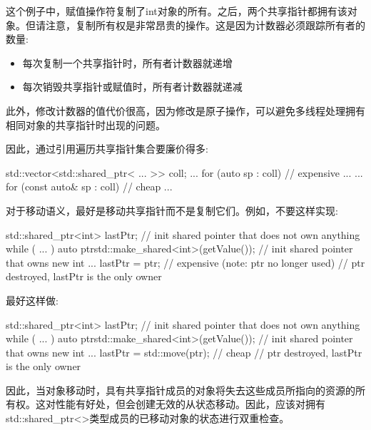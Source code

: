 这个例子中，赋值操作符复制了int对象的所有。之后，两个共享指针都拥有该对象。但请注意，复制所有权是非常昂贵的操作。这是因为计数器必须跟踪所有者的数量:\par

\begin{itemize}
  \item 每次复制一个共享指针时，所有者计数器就递增
  \item 每次销毁共享指针或赋值时，所有者计数器就递减
\end{itemize}

此外，修改计数器的值代价很高，因为修改是原子操作，可以避免多线程处理拥有相同对象的共享指针时出现的问题。\par

因此，通过引用遍历共享指针集合要廉价得多:\par

\begin{codebox}[cpp]
std::vector<std::shared_ptr< ... >> coll;
...
for (auto sp : coll) { // expensive
  ...
}
...
for (const auto& sp : coll) { // cheap
  ...
}
\end{codebox}

对于移动语义，最好是移动共享指针而不是复制它们。例如，不要这样实现:\par

\begin{codebox}[cpp]
std::shared_ptr<int> lastPtr; // init shared pointer that does not own anything
while ( ... ) {
  auto ptr{std::make_shared<int>(getValue())}; // init shared pointer that owns new int
  ...
  lastPtr = ptr; // expensive (note: ptr no longer used)
} // ptr destroyed, lastPtr is the only owner
\end{codebox}

最好这样做:\par

\begin{codebox}[cpp]
std::shared_ptr<int> lastPtr; // init shared pointer that does not own anything
while ( ... ) {
  auto ptr{std::make_shared<int>(getValue())}; // init shared pointer that owns new int
  ...
  lastPtr = std::move(ptr); // cheap
} // ptr destroyed, lastPtr is the only owner
\end{codebox}

因此，当对象移动时，具有共享指针成员的对象将失去这些成员所指向的资源的所有权。这对性能有好处，但会创建无效的从状态移动。因此，应该对拥有std::shared\_ptr<>类型成员的已移动对象的状态进行双重检查。\par


